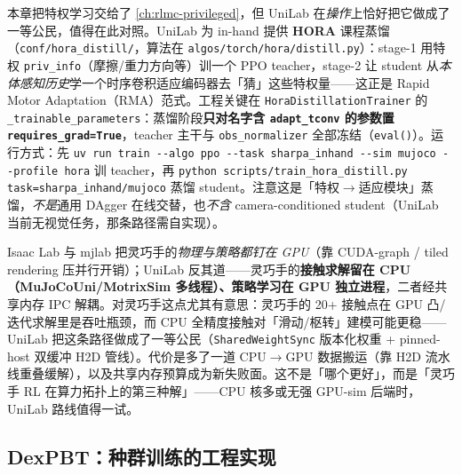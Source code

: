 \begin{note}
本章把特权学习交给了 \cref{ch:rlmc-privileged}，但 UniLab 在\emph{操作}上恰好把它做成了一等公民，值得在此对照。UniLab 为 in-hand 提供 \textbf{HORA} 课程蒸馏（\verb|conf/hora_distill/|，算法在 \verb|algos/torch/hora/distill.py|）：stage-1 用特权 \verb|priv_info|（摩擦/重力方向等）训一个 PPO teacher，stage-2 让 student 从\emph{本体感知历史}学一个时序卷积适应编码器去「猜」这些特权量——这正是 Rapid Motor Adaptation（RMA）范式。工程关键在 \verb|HoraDistillationTrainer| 的 \verb|_trainable_parameters|：蒸馏阶段\textbf{只对名字含 \texttt{adapt\_tconv} 的参数置 \texttt{requires\_grad=True}}，teacher 主干与 \verb|obs_normalizer| 全部冻结（\verb|eval()|）。运行方式：先 \verb|uv run train --algo ppo --task sharpa_inhand --sim mujoco --profile hora| 训 teacher，再 \verb|python scripts/train_hora_distill.py task=sharpa_inhand/mujoco| 蒸馏 student。注意这是「特权$\to$适应模块」蒸馏，\emph{不是}通用 DAgger 在线交替，也\emph{不含} camera-conditioned student（UniLab 当前无视觉任务，那条路径需自实现）。
\end{note}

\begin{insight}\label{ins:rlmc-manip-heterogeneous}
Isaac Lab 与 mjlab 把灵巧手的\emph{物理与策略都钉在 GPU}（靠 CUDA-graph / tiled rendering 压并行开销）；UniLab 反其道——灵巧手的\textbf{接触求解留在 CPU（MuJoCoUni/MotrixSim 多线程）、策略学习在 GPU 独立进程}，二者经共享内存 IPC 解耦。对灵巧手这点尤其有意思：灵巧手的 20+ 接触点在 GPU 凸/迭代求解里是吞吐瓶颈，而 CPU 全精度接触对「滑动/枢转」建模可能更稳——UniLab 把这条路径做成了一等公民（\verb|SharedWeightSync| 版本化权重 + pinned-host 双缓冲 H2D 管线）。代价是多了一道 CPU$\to$GPU 数据搬运（靠 H2D 流水线重叠缓解），以及共享内存预算成为新失败面。这不是「哪个更好」，而是「灵巧手 RL 在算力拓扑上的第三种解」——CPU 核多或无强 GPU-sim 后端时，UniLab 路线值得一试。
\end{insight}

\subsection{DexPBT：种群训练的工程实现}
\label{sec:rlmc-manip-pbt}

